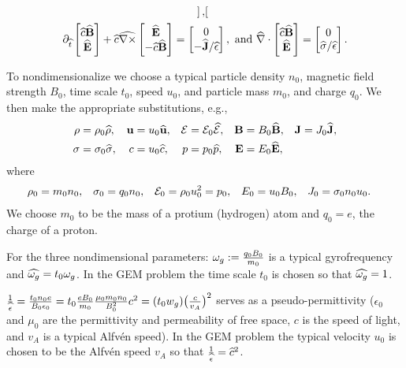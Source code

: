\documentclass[12pt,fleqn]{article}
\numberwithin{equation}{section}
\begin{document}
\begin{gather*}
\begin{bmatrix}
    \end{bmatrix},
 \\
 \partial_{\widehat t}
    \begin{bmatrix}
      \widehat c\widehat{\mathbf{B}} \\
      \widehat{\mathbf{E}}
    \end{bmatrix}
 + \widehat c \widehat {\nabla\times}
    \begin{bmatrix}
      \widehat{\mathbf{E}} \\
      -\widehat c\widehat{\mathbf{B}}
    \end{bmatrix}
 = \begin{bmatrix}
      0 \\
      -\widehat{\mathbf{J}}/{\widehat\epsilon}
    \end{bmatrix}, \hbox{ and }
  \widehat\nabla\cdot
   \begin{bmatrix}
     \widehat c\widehat{\mathbf{B}} \\
     \widehat{\mathbf{E}}
   \end{bmatrix}
 = \begin{bmatrix}
     0 \\
     \widehat{\sigma}/\widehat\epsilon
   \end{bmatrix}.
\end{gather*}

To nondimensionalize we choose a typical particle
density $n_0$, magnetic field strength $B_0$,
time scale $t_0$, speed $u_0$, and particle mass $m_0$,
and charge $q_0$.
We then make the appropriate substitutions, e.g., 
\begin{align*}
  \rho &=\rho_0\widehat\rho,
 &\mathbf{u}   &=u_0\widehat{\mathbf{u}},
 &\mathcal{E} &= \mathcal{E}_0\widehat{\mathcal{E}},
 &\mathbf{B} &= B_0\widehat{\mathbf{B}},
 &\mathbf{J} &= J_0\widehat{\mathbf{J}},
\\
  \sigma &= \sigma_0\widehat\sigma,
 &c    &=u_0\widehat c,
 &p &= p_0\widehat{p},
 &\mathbf{E} &= E_0\widehat{\mathbf{E}},
\end{align*}
where
\begin{align*}
  \rho_0 &= m_0 n_0,
 &\sigma_0 &= q_0 n_0,
 &\mathcal{E}_0 &= \rho_0 u_0^2 = p_0,
 &E_0 &= u_0 B_0,
 &J_0 &= \sigma_0 n_0 u_0.
\end{align*}
We choose $m_0$ to be the mass of a protium
(hydrogen) atom and $q_0=e$, the charge of a proton.

For the three nondimensional parameters:
$\omega_g:=\frac{q_0 B_0}{m_0}$
is a typical gyrofrequency and
$\widehat{\omega_g}=t_0\omega_g$.
In the GEM problem the time
scale $t_0$ is chosen so that $\widehat{\omega_g}=1$.

$\frac{1}{\widehat\epsilon} = \frac{t_0 n_0 e}{B_0 \epsilon_0}
   = t_0 \frac{e B_0}{m_0} \frac{\mu_0 m_0 n_0}{B_0^2} c^2
   = (t_0 w_g) \big(\frac{c}{v_A}\big)^2$
serves as a pseudo-permittivity
($\epsilon_0$ and $\mu_0$ are the permittivity 
and permeability of free space, $c$ is the
speed of light, and $v_A$ is a typical
Alfv\'en speed).  In the GEM problem the typical
velocity $u_0$ is chosen to be the Alfv\'en speed $v_A$
so that $\frac{1}{\widehat\epsilon} =\widehat c^2$.
\end{document}
